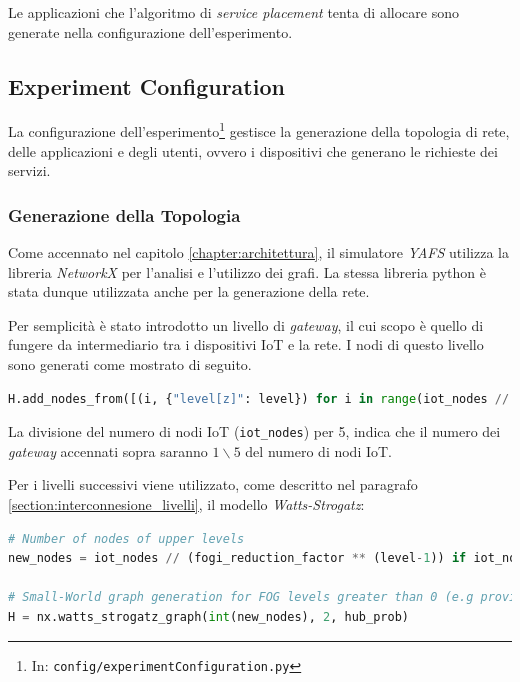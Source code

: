 Le applicazioni che l'algoritmo di \textit{service placement} tenta di allocare sono generate nella configurazione dell'esperimento.

\subsection{Experiment Configuration}

La configurazione dell'esperimento\footnote{In: \texttt{config/experimentConfiguration.py}} gestisce la generazione della topologia di rete, delle applicazioni e degli utenti, ovvero i dispositivi che generano le richieste dei servizi.

\subsubsection{Generazione della Topologia}

Come accennato nel capitolo \ref{chapter:architettura}, il simulatore \textit{YAFS} utilizza la libreria \textit{NetworkX} per l'analisi e l'utilizzo dei grafi. La stessa libreria python è stata dunque utilizzata anche per la generazione della rete.

Per semplicità è stato introdotto un livello di \textit{gateway}, il cui scopo è quello di fungere da intermediario tra i dispositivi IoT e la rete. I nodi di questo livello sono generati come mostrato di seguito.

\begin{lstlisting}[language=python]
H.add_nodes_from([(i, {"level[z]": level}) for i in range(iot_nodes // 5)])
\end{lstlisting}

La divisione del numero di nodi IoT (\texttt{iot\_nodes}) per 5, indica che il numero dei \textit{gateway} accennati sopra saranno $1\backslash 5$ del numero di nodi IoT.

Per i livelli successivi viene utilizzato, come descritto nel paragrafo \ref{section:interconnesione_livelli}, il modello \textit{Watts-Strogatz}:
\begin{lstlisting}[language=python]
# Number of nodes of upper levels
new_nodes = iot_nodes // (fogi_reduction_factor ** (level-1)) if iot_nodes // (fogi_reduction_factor**(level-1)) >= 2 else 2
                
# Small-World graph generation for FOG levels greater than 0 (e.g provincial fog nodes)
H = nx.watts_strogatz_graph(int(new_nodes), 2, hub_prob)
\end{lstlisting}

